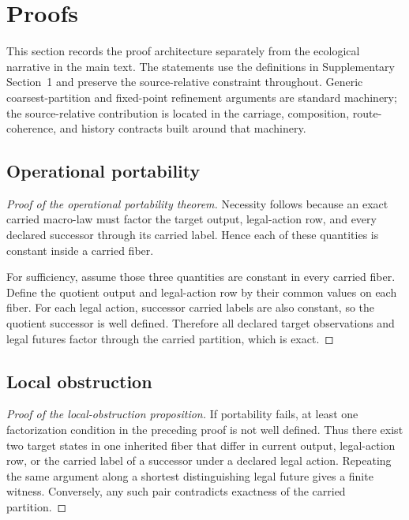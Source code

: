 \section{Proofs}

This section records the proof architecture separately from the ecological narrative in the main text. The statements use the definitions in Supplementary Section~1 and preserve the source-relative constraint throughout. Generic coarsest-partition and fixed-point refinement arguments are standard machinery; the source-relative contribution is located in the carriage, composition, route-coherence, and history contracts built around that machinery.

\subsection{Operational portability}
\begin{proof}[Proof of the operational portability theorem]
Necessity follows because an exact carried macro-law must factor the target output, legal-action row, and every declared successor through its carried label. Hence each of these quantities is constant inside a carried fiber.

For sufficiency, assume those three quantities are constant in every carried fiber. Define the quotient output and legal-action row by their common values on each fiber. For each legal action, successor carried labels are also constant, so the quotient successor is well defined. Therefore all declared target observations and legal futures factor through the carried partition, which is exact.
\end{proof}

\subsection{Local obstruction}
\begin{proof}[Proof of the local-obstruction proposition]
If portability fails, at least one factorization condition in the preceding proof is not well defined. Thus there exist two target states in one inherited fiber that differ in current output, legal-action row, or the carried label of a successor under a declared legal action. Repeating the same argument along a shortest distinguishing legal future gives a finite witness. Conversely, any such pair contradicts exactness of the carried partition.
\end{proof}

